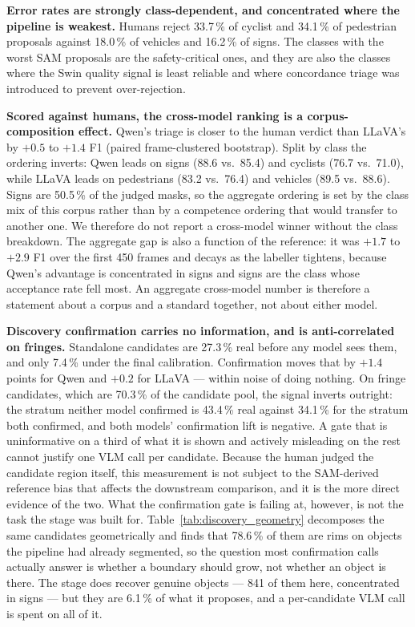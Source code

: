 \documentclass[conference]{IEEEtran}
\begin{document}
\textbf{Error rates are strongly class-dependent, and concentrated where the pipeline is weakest.}
Humans reject 33.7\,\% of cyclist and 34.1\,\% of pedestrian proposals against
18.0\,\% of vehicles and 16.2\,\% of signs. The classes with the worst SAM proposals are
the safety-critical ones, and they are also the classes where the Swin quality signal is least reliable
and where concordance triage was introduced to prevent over-rejection.

\textbf{Scored against humans, the cross-model ranking is a corpus-composition effect.}
Qwen's triage is closer to the human verdict than LLaVA's by $+0.5$ to $+1.4$ F1 (paired
frame-clustered bootstrap). Split by class the ordering inverts: Qwen leads on signs
(88.6 vs.\ 85.4) and cyclists (76.7 vs.\ 71.0), while LLaVA leads on
pedestrians (83.2 vs.\ 76.4) and vehicles (89.5 vs.\ 88.6).
Signs are 50.5\,\% of the judged masks, so the aggregate ordering is set by the class mix of
this corpus rather than by a competence ordering that would transfer to another one. We therefore do
not report a cross-model winner without the class breakdown.
The aggregate gap is also a function of the reference: it was $+1.7$ to $+2.9$ F1 over the first 450
frames and decays as the labeller tightens, because Qwen's advantage is concentrated in signs and
signs are the class whose acceptance rate fell most. An aggregate cross-model number is therefore a
statement about a corpus and a standard together, not about either model.

\textbf{Discovery confirmation carries no information, and is anti-correlated on fringes.}
Standalone candidates are 27.3\,\% real before any model sees them, and only 7.4\,\% under the final
calibration. Confirmation moves that by $+1.4$ points for Qwen and $+0.2$ for LLaVA --- within noise of
doing nothing. On fringe candidates, which are 70.3\,\% of the candidate pool, the signal inverts
outright: the stratum neither model confirmed is 43.4\,\% real against 34.1\,\% for the stratum both
confirmed, and both models' confirmation lift is negative. A gate that is uninformative on a third of
what it is shown and actively misleading on the rest cannot justify one VLM call per candidate.
Because the human judged the candidate region itself, this measurement is not subject to the
SAM-derived reference bias that affects the downstream comparison, and it is the more direct evidence
of the two.
What the confirmation gate is failing at, however, is not the task the stage was built for.
Table~\ref{tab:discovery_geometry} decomposes the same candidates geometrically and finds that
78.6\,\% of them are rims on objects the pipeline had already segmented, so the question most
confirmation calls actually answer is whether a boundary should grow, not whether an object is there.
The stage does recover genuine objects --- 841 of them here, concentrated in signs --- but they are
6.1\,\% of what it proposes, and a per-candidate VLM call is spent on all of it.
\end{document}
